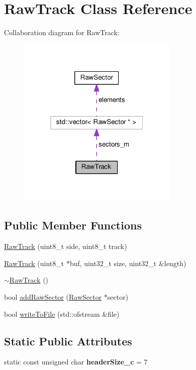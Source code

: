 \hypertarget{classRawTrack}{}\section{Raw\+Track Class Reference}
\label{classRawTrack}


Collaboration diagram for Raw\+Track\+:
\nopagebreak
\begin{figure}[H]
\begin{center}
\leavevmode
\includegraphics[width=217pt]{classRawTrack__coll__graph}
\end{center}
\end{figure}
\subsection*{Public Member Functions}
\begin{DoxyCompactItemize}
\item 
\hyperlink{classRawTrack_a0cbbfccb5147d2bab4b7f993729dad2c}{Raw\+Track} (uint8\+\_\+t side, uint8\+\_\+t track)
\item 
\hyperlink{classRawTrack_a85a059917e73c541b9823ef9a85d5f76}{Raw\+Track} (uint8\+\_\+t $\ast$buf, uint32\+\_\+t size, uint32\+\_\+t \&length)
\item 
\hyperlink{classRawTrack_a5db4243f25876da1d313e585905f9af9}{$\sim$\+Raw\+Track} ()
\item 
bool \hyperlink{classRawTrack_ab401f274eed5183474c82fca1c00716a}{add\+Raw\+Sector} (\hyperlink{classRawSector}{Raw\+Sector} $\ast$sector)
\item 
bool \hyperlink{classRawTrack_aa88642dea527ea5af9dc076d58bb0b2e}{write\+To\+File} (std\+::ofstream \&file)
\end{DoxyCompactItemize}
\subsection*{Static Public Attributes}
\begin{DoxyCompactItemize}
\item 
\hypertarget{classRawTrack_a619ccb2b639303075459df45bef473b3}{}static const unsigned char {\bfseries header\+Size\+\_\+c} = 7\label{classRawTrack_a619ccb2b639303075459df45bef473b3}

\end{DoxyCompactItemize}
